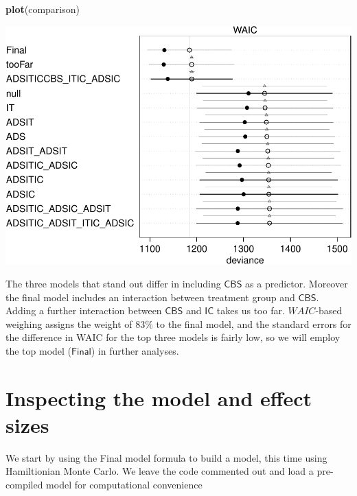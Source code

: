 \documentclass[10pt,dvipsnames,enabledeprecatedfontcommands]{scrartcl}
\newenvironment{Shaded}{\begin{snugshade}}{\end{snugshade}}
\newcommand{\KeywordTok}[1]{\textcolor[rgb]{0.13,0.29,0.53}{\textbf{#1}}}
\newcommand{\NormalTok}[1]{#1}
\begin{document}
\begin{Shaded}
\begin{Highlighting}[]
\KeywordTok{plot}\NormalTok{(comparison)}
\end{Highlighting}
\end{Shaded}

\begin{center}\includegraphics[width=1\linewidth]{bayesianReport_files/figure-latex/unnamed-chunk-11-1} \end{center}

\normalsize

The three models that stand out differ in including \(\mathsf{CBS}\) as
a predictor. Moreover the final model includes an interaction between
treatment group and \(\mathsf{CBS}\). Adding a further interaction
between \(\mathsf{CBS}\) and \(\mathsf{IC}\) takes us too far.
\(WAIC\)-based weighing assigns the weight of \(83\%\) to the final
model, and the standard errors for the difference in WAIC for the top
three models is fairly low, so we will employ the top model
(\(\mathsf{Final}\)) in further analyses.

\section{Inspecting the model and effect
sizes}\label{inspecting-the-model-and-effect-sizes}

We start by using the \textsf{Final} model formula to build a model,
this time using Hamiltionian Monte Carlo. We leave the code commented
out and load a pre-compiled model for computational convenience

\vspace{1mm} \footnotesize
\end{document}
